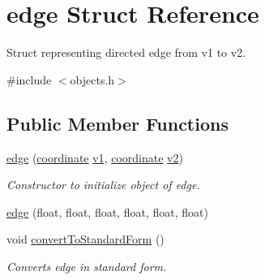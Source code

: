 \hypertarget{structedge}{}\section{edge Struct Reference}
\label{structedge}


Struct representing directed edge from v1 to v2.  




{\ttfamily \#include $<$objects.\+h$>$}

\subsection*{Public Member Functions}
\begin{DoxyCompactItemize}
\item 
\mbox{\hyperlink{structedge_aabfb062b5ca49e6cc13a40b3670665b6}{edge}} (\mbox{\hyperlink{structcoordinate}{coordinate}} \mbox{\hyperlink{structedge_aa0be03a8ab19817782042e48a727c146}{v1}}, \mbox{\hyperlink{structcoordinate}{coordinate}} \mbox{\hyperlink{structedge_a0d40d224ece0488b6a506ab842f0fa41}{v2}})
\begin{DoxyCompactList}\small\item\em Constructor to initialize object of edge. \end{DoxyCompactList}\item 
\mbox{\hyperlink{structedge_a1d17984abbf61a4d2d7b88c1113cb67e}{edge}} (float, float, float, float, float, float)
\item 
void \mbox{\hyperlink{structedge_adba29fb1e5fdb9f55cfcb3b0f57b407e}{convert\+To\+Standard\+Form}} ()
\begin{DoxyCompactList}\small\item\em Converts edge in standard form. \end{DoxyCompactList}\end{DoxyCompactItemize}
